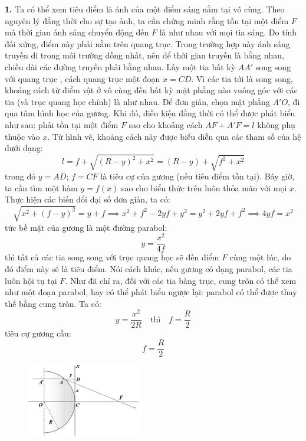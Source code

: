 \noindent\textbf{1.} Ta có thể xem tiêu điểm là ảnh của một điểm sáng nằm tại vô cùng. Theo nguyên lý đẳng thời cho sự  tạo ảnh, ta cần chứng minh rằng tồn tại một điểm $F$ mà  thời gian ánh sáng chuyển động đến $F$ là như nhau với mọi tia sáng. Do tính đối xứng, điểm này phải nằm trên quang trục. Trong trường hợp này ánh sáng truyền đi trong môi trường đồng nhất, nên để thời gian truyền là bằng nhau, chiều dài các đường truyền phải bằng nhau. Lấy một tia bất kỳ $AA' $ song song với quang trục , cách quang trục một đoạn $x=CD$. Vì các tia tới là song song, khoảng cách từ điểm vật ở vô cùng đến bất kỳ mặt phẳng nào vuông góc với các tia (và trục quang học chính) là như nhau. Để đơn giản, chọn mặt phẳng $A'O $, đi qua tâm hình học của gương. Khi đó, điều kiện đẳng thời có thể được phát biểu như sau: phải tồn tại một điểm $F$ sao cho khoảng cách $ AF + A'F = l $ không phụ thuộc vào $ x $. Từ hình vẽ, khoảng cách này được biểu diễn qua các tham số của hệ dưới dạng:
\begin{equation}
  \label{eq:34}
  l = f + \sqrt{(R - y)^{2} + x^{2}} = (R - y) + \sqrt{f^{2} + x^{2}}
\end{equation}
trong đó $ y = AD $; $ f = CF $ là tiêu cự của gương (nếu tiêu điểm tồn tại). Bây giờ, ta cần tìm một hàm $ y = f(x) $ sao cho biểu thức trên luôn thỏa mãn với mọi $ x $. Thực hiện các biến đổi đại số đơn giản, ta có:
\begin{equation}
  \label{eq:35}
  \sqrt{x^{2} + (f-y)^{2} } = y + f \implies x^{2}+f^{2}-2yf+y^{2}=y^{2}+2yf+f^{2}\implies 4yf=x^{2}
\end{equation}
tức bề mặt của gương là một đường parabol:
\begin{equation}
  \label{eq:36}
  y = \frac{x^{2}}{4f}
\end{equation}
thì tất cả các tia song song với trục quang học sẽ đến điểm $ F $ cùng một lúc, do đó điểm này sẽ là tiêu điểm.
Nói cách khác, nếu gương có dạng parabol, các tia luôn hội tụ tại $F$. Như đã chỉ ra, đối với các tia bàng trục, cung tròn có thể xem như một đoạn parabol, hay có thể phát biểu ngược lại: parabol có thể được thay thế bằng cung tròn. Ta có:
\begin{equation}
  \label{eq:37}
  y = \frac{x^{2}}{2R} \quad \text{thì} \quad f = \frac{R}{2}
\end{equation}
tiêu cự gương cầu:
\begin{equation}
  \label{eq:38}
  f = \frac{R}{2}
\end{equation}

\begin{figure}
  \centering
  \vspace{-4mm}
  \includegraphics[width=0.45\textwidth]{Figures/P3/Fig 3.2S.png}
\end{figure}

